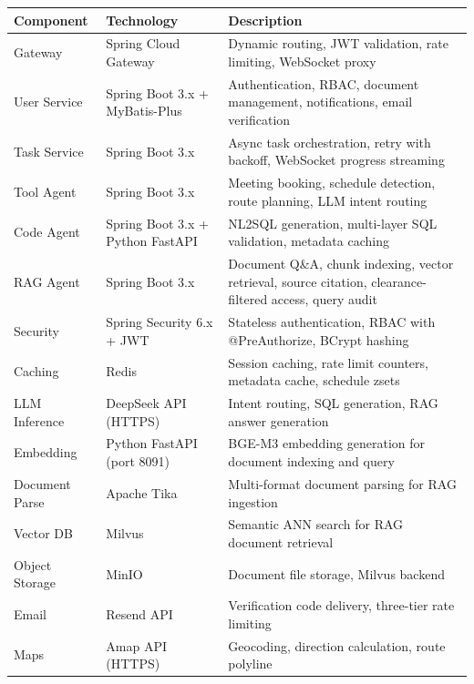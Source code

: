 \begin{table}[H]
\begin{tabular}{@{}p{3cm}p{3.5cm}p{\dimexpr\textwidth-6.5cm-4\tabcolsep\relax}@{}}
\toprule
\textbf{Component} & \textbf{Technology} & \textbf{Description} \\
\midrule
Gateway        & Spring Cloud Gateway        & Dynamic routing, JWT validation, rate limiting, WebSocket proxy \\
User Service   & Spring Boot 3.x + MyBatis-Plus & Authentication, RBAC, document management, notifications, email verification \\
Task Service   & Spring Boot 3.x             & Async task orchestration, retry with backoff, WebSocket progress streaming \\
Tool Agent     & Spring Boot 3.x             & Meeting booking, schedule detection, route planning, LLM intent routing \\
Code Agent     & Spring Boot 3.x + Python FastAPI & NL2SQL generation, multi-layer SQL validation, metadata caching \\
RAG Agent      & Spring Boot 3.x             & Document Q\&A, chunk indexing, vector retrieval, source citation, clearance-filtered access, query audit \\
Security       & Spring Security 6.x + JWT   & Stateless authentication, RBAC with @PreAuthorize, BCrypt hashing \\
Caching        & Redis                       & Session caching, rate limit counters, metadata cache, schedule zsets \\
LLM Inference  & DeepSeek API (HTTPS)        & Intent routing, SQL generation, RAG answer generation \\
Embedding      & Python FastAPI (port 8091)  & BGE-M3 embedding generation for document indexing and query \\
Document Parse & Apache Tika                 & Multi-format document parsing for RAG ingestion \\
Vector DB      & Milvus                      & Semantic ANN search for RAG document retrieval \\
Object Storage & MinIO                       & Document file storage, Milvus backend \\
Email          & Resend API                  & Verification code delivery, three-tier rate limiting \\
Maps           & Amap API (HTTPS)            & Geocoding, direction calculation, route polyline \\
\bottomrule
\end{tabular}
\end{table}

